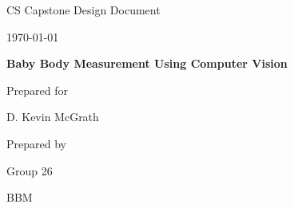 \documentclass[onecolumn, draftclsnofoot,10pt, compsoc]{IEEEtran}
\def \CapstoneTeamName{		BBM}
\def \CapstoneTeamNumber{		26}
\def \GroupMemberOne{			Aidan Grimshaw}
\def \GroupMemberTwo{			Khoa Tran}
\def \GroupMemberThree{			Aaron Leenknecht}
\def \CapstoneProjectName{		Baby Body Measurement Using Computer Vision}
\def \CapstoneSponsorPerson{		D. Kevin McGrath}
\def \DocType{		%
				Design Document
				}
\newcommand{\NameSigPair}[1]{\par
\makebox[2.75in][r]{#1} \hfil 	\makebox[3.25in]{\makebox[2.25in]{\hrulefill} \hfill		\makebox[.75in]{\hrulefill}}
\par\vspace{-12pt} \textit{\tiny\noindent
\makebox[2.75in]{} \hfil		\makebox[3.25in]{\makebox[2.25in][r]{Signature} \hfill	\makebox[.75in][r]{Date}}}}
\renewcommand{\NameSigPair}[1]{#1}
\begin{document}
\begin{titlepage}
    \begin{singlespace}
        \hfill 
        \par\vspace{.2in}
        \centering
        \scshape{
            \huge CS Capstone \DocType \par
            {\large\today}\par
            \vspace{.5in}
            \textbf{\Huge\CapstoneProjectName}\par
            \vspace{10mm}
            {\large Prepared for}\par
            \vspace{5mm}
            {\Large\NameSigPair{\CapstoneSponsorPerson}\par}
            \vspace{5mm}
            {\large Prepared by }\par
            \vspace{5mm}
            Group\CapstoneTeamNumber\par
            \CapstoneTeamName\par 
            \vspace{5pt}
            {\Large
                
}}
\end{singlespace}
\end{titlepage}
\end{document}
